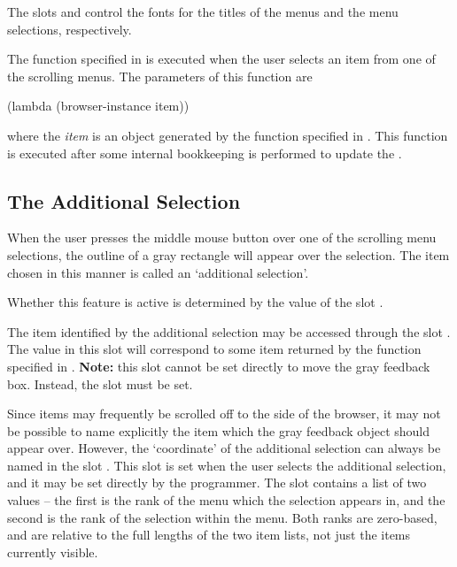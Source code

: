 The slots  and  control the fonts for
the titles of the menus and the menu selections, respectively.

The function specified in  is executed when
the user selects an item from one of the scrolling menus.  The
parameters of this function are
\begin{programexample}
(lambda (browser-instance item))
\end{programexample}
where the {\it item} is an object generated by the
function specified in .  This
function is executed after some internal bookkeeping is performed to
update the .


\subsection{The Additional Selection}
\label{additional}
 When the user presses the middle mouse
button over one of the scrolling menu selections, the outline of a
gray rectangle will appear over the selection.  The item chosen in
this manner is called an `additional selection'.

Whether this feature is active is determined by the value of the slot
.

The item identified by the additional selection may be accessed
through the slot .  The value in this slot
will correspond to some item returned by the function specified in
.  {\bf Note:} this slot cannot be
set directly to move the gray feedback box.  Instead, the
 slot must be set.

Since items may frequently be scrolled off to the side of the browser,
it may not be possible to name explicitly the item which the gray
feedback object should appear over.  However, the `coordinate' of the
additional selection can always be named in the slot
.  This slot is set when the user
selects the additional selection, and it may be set directly by the
programmer.  The  slot contains a
list of two values -- the first is the rank of the menu which the
selection appears in, and the second is the rank of the selection
within the menu.  Both ranks are zero-based, and are relative to the
full lengths of the two item lists, not just the items currently
visible.

